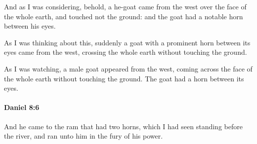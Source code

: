 			\begin{versebox}
					\item[BHS] 
					\item[LXX] 
					\item[ASV] And as I was considering, behold, a he-goat came from the west over the face of the whole earth, and touched not the ground: and the goat had a notable horn between his eyes.
					\item[NIV] As I was thinking about this, suddenly a goat with a prominent horn between its eyes came from the west, crossing the whole earth without touching the ground.
					\item[NRSV] As I was watching, a male goat appeared from the west, coming across the face of the whole earth without touching the ground. The goat had a horn between its eyes.
			\end{versebox}

		\paragraph{Daniel 8:6} %
			\label{DANIEL-8-6}

			And he came to the ram that had two horns, which I had seen standing before the river, and ran unto him in the fury of his power.

